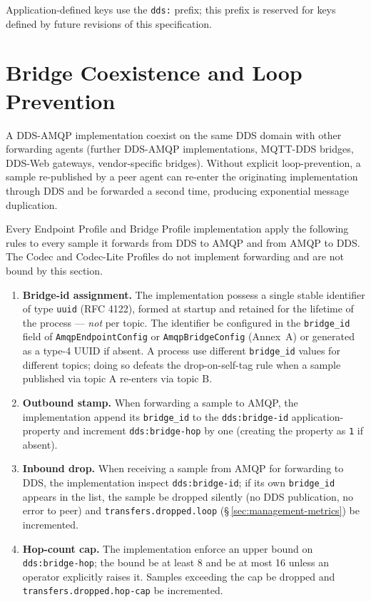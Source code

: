 \documentclass{../styles/zerodds-vendor-spec}
\begin{document}
Application-defined keys  use the \texttt{dds:}
prefix; this prefix is reserved for keys defined by future
revisions of this specification.

\section{Bridge Coexistence and Loop Prevention}\label{sec:bridge-coexistence}

A DDS-AMQP implementation  coexist on the same DDS
domain with other forwarding agents (further DDS-AMQP
implementations, MQTT-DDS bridges, DDS-Web gateways,
vendor-specific bridges). Without explicit loop-prevention, a
sample re-published by a peer agent can re-enter the originating
implementation through DDS and be forwarded a second time,
producing exponential message duplication.

Every Endpoint Profile and Bridge Profile implementation
 apply the following rules to every sample it
forwards from DDS to AMQP and from AMQP to DDS. The Codec and
Codec-Lite Profiles do not implement forwarding and are not
bound by this section.

\begin{enumerate}
  \item \textbf{Bridge-id assignment.} The implementation
         possess a single stable identifier of type
        \texttt{uuid} (RFC 4122), formed at startup and retained
        for the lifetime of the process — \emph{not} per topic.
        The identifier  be configured in the
        \texttt{bridge\_id} field of \texttt{AmqpEndpointConfig}
        or \texttt{AmqpBridgeConfig} (Annex~A) or generated as a
        type-4 UUID if absent. A process  use
        different \texttt{bridge\_id} values for different
        topics; doing so defeats the drop-on-self-tag rule when a
        sample published via topic A re-enters via topic B.
  \item \textbf{Outbound stamp.} When forwarding a sample to AMQP,
        the implementation  append its
        \texttt{bridge\_id} to the \texttt{dds:bridge-id}
        application-property and  increment
        \texttt{dds:bridge-hop} by one (creating the property as
        \texttt{1} if absent).
  \item \textbf{Inbound drop.} When receiving a sample from AMQP
        for forwarding to DDS, the implementation 
        inspect \texttt{dds:bridge-id}; if its own
        \texttt{bridge\_id} appears in the list, the sample
         be dropped silently (no DDS publication, no
        error to peer) and \texttt{transfers.dropped.loop}
        (\S\,\ref{sec:management-metrics})  be
        incremented.
  \item \textbf{Hop-count cap.} The implementation 
        enforce an upper bound on \texttt{dds:bridge-hop}; the
        bound  be at least 8 and  be
        at most 16 unless an operator explicitly raises it.
        Samples exceeding the cap  be dropped and
        \texttt{transfers.dropped.hop-cap}  be
        incremented.
\end{enumerate}
\end{document}
